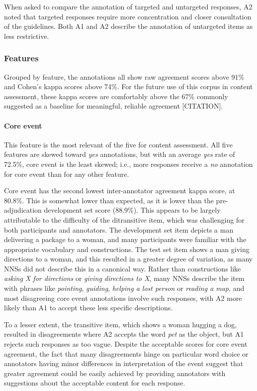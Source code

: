 \documentclass[11pt,a4paper]{article}
\begin{document}
When asked to compare the annotation of targeted and untargeted responses, A2 noted that targeted responses require more concentration and closer consultation of the guidelines. Both A1 and A2 describe the annotation of untargeted items as less restrictive.

\subsubsection{Features} Grouped by feature, the annotations all show raw agreement scores above 91\% and Cohen's kappa scores above 74\%. For the future use of this corpus in content assessment, these kappa scores are comfortably above the 67\% commonly suggested as a baseline for meaningful, reliable agreement [CITATION].

\paragraph{Core event} This feature is the most relevant of the five for content assessment. All five features are skewed toward \textit{yes} annotations, but with an average \textit{yes} rate of 72.5\%, core event is the least skewed; i.e., more responses receive a \textit{no} annotation for core event than for any other feature.

Core event has the second lowest inter-annotator agreement kappa score, at 80.8\%. This is somewhat lower than expected, as it is lower than the pre-adjudication development set score (88.9\%). This appears to be largely attributable to the difficulty of the ditransitive item, which was challenging for both participants and annotators. The development set item depicts a man delivering a package to a woman, and many participants were familiar with the appropriate vocabulary and constructions. The test set item shows a man giving directions to a woman, and this resulted in a greater degree of variation, as many NNSs did not describe this in a canonical way.  Rather than constructions like \textit{asking X for directions} or \textit{giving directions to X}, many NNSs describe the item with phrases like \textit{pointing}, \textit{guiding}, \textit{helping a lost person} or \textit{reading a map}, and most disagreeing core event annotations involve such responses, with A2 more likely than A1 to accept these less specific descriptions.

To a lesser extent, the transitive item, which shows a woman hugging a dog, resulted in disagreements where A2 accepts the word \textit{pet} as the object, but A1 rejects such responses as too vague. Despite the acceptable scores for core event agreement, the fact that many disagreements hinge on particular word choice or annotators having minor differences in interpretation of the event suggest that greater agreement could be easily achieved by providing annotators with suggestions about the acceptable content for each response. 
\end{document}

